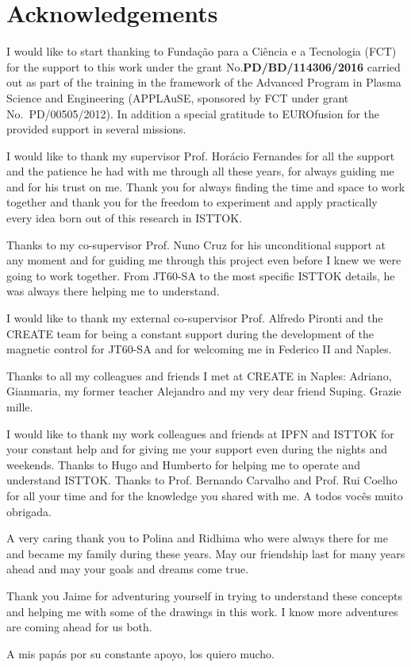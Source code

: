 \chapter*{Acknowledgements}

I would like to start thanking to Funda\c{c}\~{a}o para a Ci\^{e}ncia e a Tecnologia (FCT) for the support to this work under the grant No.\textbf{PD/BD/114306/2016} carried out as part of the training in the framework of the Advanced Program in Plasma Science and Engineering (APPLAuSE, sponsored by FCT under grant No.~PD/00505/2012). In addition a special gratitude to EUROfusion for the provided support in several missions. 
\smallskip

I would like to thank my supervisor Prof. Horácio Fernandes for all the support and the patience he had with me through all these years, for always guiding me and for his trust on me. Thank you for always finding the time and space to work together and thank you for the  freedom to experiment and apply practically every idea born out of this research  in ISTTOK.
\smallskip

Thanks to my co-supervisor Prof. Nuno Cruz for his unconditional support at any moment and for guiding me through this project even before I knew we were going to work together. From JT60-SA to the most specific ISTTOK details, he was always there helping me to understand.
\smallskip

I would like to thank my external co-supervisor Prof. Alfredo Pironti and the CREATE team for being a constant support during the development of the magnetic control for JT60-SA  and for welcoming me in Federico II and Naples. \smallskip

Thanks to all my colleagues and friends I met at CREATE in Naples: Adriano, Gianmaria, my former teacher Alejandro and my very dear friend Suping. Grazie mille.\smallskip

I would like to thank my work colleagues and friends at IPFN and ISTTOK for your constant help and for giving me your support even during the nights and weekends. Thanks to Hugo and Humberto for helping me to operate and understand ISTTOK. Thanks to Prof. Bernando Carvalho and Prof. Rui Coelho for all your time and for the knowledge you shared with me. A todos vocês muito obrigada.\smallskip


A very caring thank you to Polina and Ridhima who were always there for me and became my family during these years. May our friendship last for many years ahead and may your goals and dreams come true.\smallskip

Thank you Jaime for adventuring yourself in trying to understand these concepts and helping me with some of the drawings in this work. I know more adventures are coming ahead for us both.\smallskip

A mis papás por su constante apoyo, los quiero mucho.   

 





